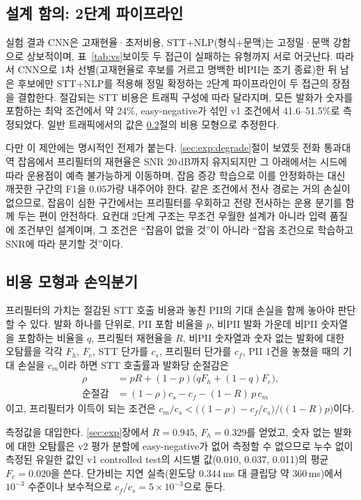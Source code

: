 \documentclass[11pt]{article}
\begin{document}
\subsection{설계 함의: 2단계 파이프라인}
실험 결과 CNN은 고재현율·초저비용, STT+NLP(형식+문맥)는 고정밀·문맥 강함으로 상보적이며,
표~\ref{tab:vs}\가 보이듯 두 접근이 실패하는 유형까지 서로 어긋난다. 따라서 CNN으로 1차
선별(고재현율로 후보를 거르고 명백한 비PII는 조기 종료)한 뒤 남은 후보에만 STT+NLP를 적용해
정밀 확정하는 2단계 파이프라인이 두 접근의 장점을 결합한다. 절감되는 STT 비용은 트래픽
구성에 따라 달라지며, 모든 발화가 숫자를 포함하는 최악 조건에서 약 24\%, easy-negative가
섞인 v1 조건에서 41.6--51.5\%로 측정되었다. 일반 트래픽에서의 값은
\ref{sec:discuss:cost}절의 비용 모형으로 추정한다.

다만 이 제안에는 명시적인 전제가 붙는다. \ref{sec:exp:degrade}절이 보였듯 전화 통과대역 잡음에서
프리필터의 재현율은 SNR 20\,dB까지 유지되지만 그 아래에서는 시드에 따라 운용점이 예측 불가능하게
이동하며, 잡음 증강 학습으로 이를 안정화하는 대신 깨끗한 구간의 F1을 $0.05$가량 내주어야 한다.
같은 조건에서 전사 경로는 거의 손실이 없으므로, 잡음이 심한 구간에서는 프리필터를 우회하고 전량
전사하는 운용 분기를 함께 두는 편이 안전하다. 요컨대 2단계 구조는 무조건 우월한 설계가 아니라
입력 품질에 조건부인 설계이며, 그 조건은 ``잡음이 없을 것''이 아니라 ``잡음 조건으로 학습하고
SNR에 따라 분기할 것''이다.

\subsection{비용 모형과 손익분기}\label{sec:discuss:cost}
프리필터의 가치는 절감된 STT 호출 비용과 놓친 PII의 기대 손실을 함께 놓아야 판단할 수 있다.
발화 하나를 단위로, PII 포함 비율을 $p$, 비PII 발화 가운데 비PII 숫자열을 포함하는 비율을
$q$, 프리필터 재현율을 $R$, 비PII 숫자열과 숫자 없는 발화에 대한 오탐률을 각각 $F_h$, $F_e$,
STT 단가를 $c_s$, 프리필터 단가를 $c_f$, PII 1건을 놓쳤을 때의 기대 손실을 $c_m$이라 하면
STT 호출률과 발화당 순절감은
\begin{align}
\rho &= pR + (1-p)\bigl(qF_h + (1-q)F_e\bigr), \\
\text{순절감} &= (1-\rho)c_s - c_f - (1-R)\,p\,c_m
\end{align}
이고, 프리필터가 이득이 되는 조건은 $c_m/c_s < \bigl((1-\rho) - c_f/c_s\bigr)\big/\bigl((1-R)p\bigr)$이다.

측정값을 대입한다. \ref{sec:exp}장에서 $R=0.945$, $F_h=0.329$를 얻었고, 숫자 없는 발화에 대한
오탐률은 v2 평가 분할에 easy-negative가 없어 측정할 수 없으므로 누수 없이 측정된 유일한
값인 v1 controlled test의 시드별 값(0.010, 0.037, 0.011)의 평균 $F_e=0.020$을 쓴다. 단가비는
지연 실측(윈도당 $0.344$\,ms 대 클립당 약 $360$\,ms)에서 $10^{-3}$ 수준이나 보수적으로
$c_f/c_s=5\times10^{-3}$으로 둔다.
\end{document}

